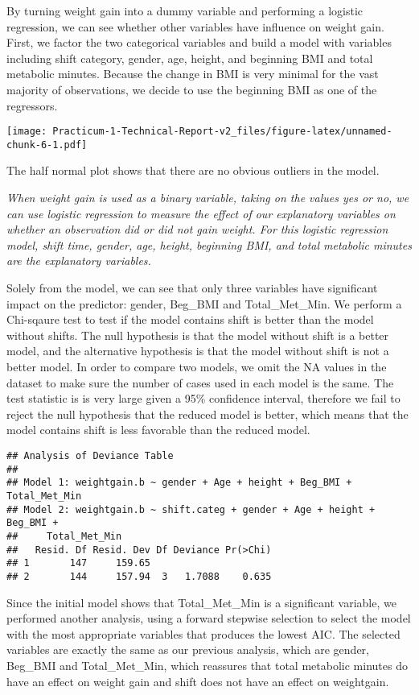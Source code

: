 \documentclass[]{article}
\begin{document}
By turning weight gain into a dummy variable and performing a logistic
regression, we can see whether other variables have influence on weight
gain. First, we factor the two categorical variables and build a model
with variables including shift category, gender, age, height, and
beginning BMI and total metabolic minutes. Because the change in BMI is
very minimal for the vast majority of observations, we decide to use the
beginning BMI as one of the regressors.

\texttt{[image: Practicum-1-Technical-Report-v2\_files/figure-latex/unnamed-chunk-6-1.pdf]}

The half normal plot shows that there are no obvious outliers in the
model.

\emph{When weight gain is used as a binary variable, taking on the
values yes or no, we can use logistic regression to measure the effect
of our explanatory variables on whether an observation did or did not
gain weight. For this logistic regression model, shift time, gender,
age, height, beginning BMI, and total metabolic minutes are the
explanatory variables.}

Solely from the model, we can see that only three variables have
significant impact on the predictor: gender, Beg\_BMI and
Total\_Met\_Min. We perform a Chi-sqaure test to test if the model
contains shift is better than the model without shifts. The null
hypothesis is that the model without shift is a better model, and the
alternative hypothesis is that the model without shift is not a better
model. In order to compare two models, we omit the NA values in the
dataset to make sure the number of cases used in each model is the same.
The test statistic is is very large given a 95\% confidence interval,
therefore we fail to reject the null hypothesis that the reduced model
is better, which means that the model contains shift is less favorable
than the reduced model.

\begin{verbatim}
## Analysis of Deviance Table
## 
## Model 1: weightgain.b ~ gender + Age + height + Beg_BMI + Total_Met_Min
## Model 2: weightgain.b ~ shift.categ + gender + Age + height + Beg_BMI + 
##     Total_Met_Min
##   Resid. Df Resid. Dev Df Deviance Pr(>Chi)
## 1       147     159.65                     
## 2       144     157.94  3   1.7088    0.635
\end{verbatim}

Since the initial model shows that Total\_Met\_Min is a significant
variable, we performed another analysis, using a forward stepwise
selection to select the model with the most appropriate variables that
produces the lowest AIC. The selected variables are exactly the same as
our previous analysis, which are gender, Beg\_BMI and Total\_Met\_Min,
which reassures that total metabolic minutes do have an effect on weight
gain and shift does not have an effect on weightgain.
\end{document}
